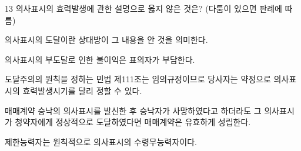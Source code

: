 \begin{question}{13}
의사표시의 효력발생에 관한 설명으로 옳지 않은 것은? (다툼이 있으면 판례에 따름)
\begin{choices}
  \item 의사표시의 도달이란 상대방이 그 내용을 안 것을 의미한다.
  \item 의사표시의 부도달로 인한 불이익은 표의자가 부담한다.
  \item 도달주의의 원칙을 정하는 민법 제111조는 임의규정이므로 당사자는 약정으로 의사표시의 효력발생시기를 달리 정할 수 있다.
  \item 매매계약 승낙의 의사표시를 발신한 후 승낙자가 사망하였다고 하더라도 그 의사표시가 청약자에게 정상적으로 도달하였다면 매매계약은 유효하게 성립한다.
  \item 제한능력자는 원칙적으로 의사표시의 수령무능력자이다.
\end{choices}
\end{question}
